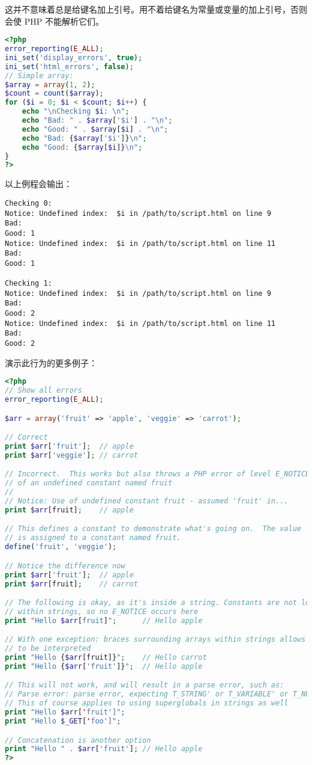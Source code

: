 这并不意味着总是给键名加上引号。用不着给键名为常量或变量的加上引号，否则会使 PHP 不能解析它们。

\begin{lstlisting}[language=PHP]
<?php
error_reporting(E_ALL);
ini_set('display_errors', true);
ini_set('html_errors', false);
// Simple array:
$array = array(1, 2);
$count = count($array);
for ($i = 0; $i < $count; $i++) {
    echo "\nChecking $i: \n";
    echo "Bad: " . $array['$i'] . "\n";
    echo "Good: " . $array[$i] . "\n";
    echo "Bad: {$array['$i']}\n";
    echo "Good: {$array[$i]}\n";
}
?>
\end{lstlisting}


以上例程会输出：


\begin{verbatim}
Checking 0: 
Notice: Undefined index:  $i in /path/to/script.html on line 9
Bad: 
Good: 1
Notice: Undefined index:  $i in /path/to/script.html on line 11
Bad: 
Good: 1

Checking 1: 
Notice: Undefined index:  $i in /path/to/script.html on line 9
Bad: 
Good: 2
Notice: Undefined index:  $i in /path/to/script.html on line 11
Bad: 
Good: 2
\end{verbatim}

演示此行为的更多例子：


\begin{lstlisting}[language=PHP]
<?php
// Show all errors
error_reporting(E_ALL);

$arr = array('fruit' => 'apple', 'veggie' => 'carrot');

// Correct
print $arr['fruit'];  // apple
print $arr['veggie']; // carrot

// Incorrect.  This works but also throws a PHP error of level E_NOTICE because
// of an undefined constant named fruit
// 
// Notice: Use of undefined constant fruit - assumed 'fruit' in...
print $arr[fruit];    // apple

// This defines a constant to demonstrate what's going on.  The value 'veggie'
// is assigned to a constant named fruit.
define('fruit', 'veggie');

// Notice the difference now
print $arr['fruit'];  // apple
print $arr[fruit];    // carrot

// The following is okay, as it's inside a string. Constants are not looked for
// within strings, so no E_NOTICE occurs here
print "Hello $arr[fruit]";      // Hello apple

// With one exception: braces surrounding arrays within strings allows constants
// to be interpreted
print "Hello {$arr[fruit]}";    // Hello carrot
print "Hello {$arr['fruit']}";  // Hello apple

// This will not work, and will result in a parse error, such as:
// Parse error: parse error, expecting T_STRING' or T_VARIABLE' or T_NUM_STRING'
// This of course applies to using superglobals in strings as well
print "Hello $arr['fruit']";
print "Hello $_GET['foo']";

// Concatenation is another option
print "Hello " . $arr['fruit']; // Hello apple
?>
\end{lstlisting}

